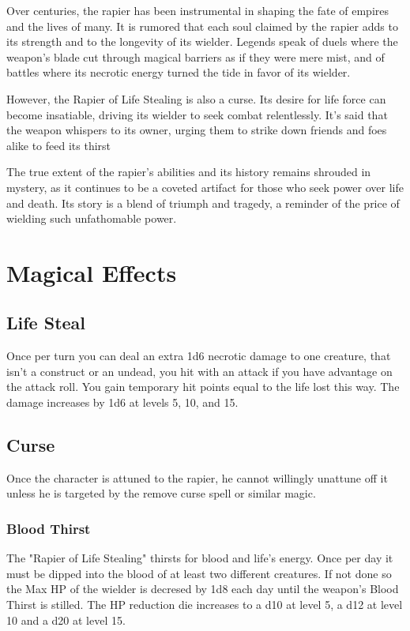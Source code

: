 Over centuries, the rapier has been instrumental in shaping the fate of empires and the lives of many. It is rumored that each soul claimed by the rapier adds to its strength and to the longevity of its wielder. Legends speak of duels where the weapon's blade cut through magical barriers as if they were mere mist, and of battles where its necrotic energy turned the tide in favor of its wielder.

However, the Rapier of Life Stealing is also a curse. Its desire for life force can become insatiable, driving its wielder to seek combat relentlessly. It's said that the weapon whispers to its owner, urging them to strike down friends and foes alike to feed its thirst

The true extent of the rapier's abilities and its history remains shrouded in mystery, as it continues to be a coveted artifact for those who seek power over life and death. Its story is a blend of triumph and tragedy, a reminder of the price of wielding such unfathomable power.

\section*{Magical Effects}
\subsection*{Life Steal}
Once per turn you can deal an extra 1d6 necrotic damage to one creature, that isn't a construct or an undead, you hit with an attack if you have advantage on the attack roll. You gain temporary hit points equal to the life lost this way. The damage increases by 1d6 at levels 5, 10, and 15.
\subsection*{Curse}
Once the character is attuned to the rapier, he cannot willingly unattune off it unless he is targeted by the remove curse spell or similar magic.
\subsubsection*{Blood Thirst}
The "Rapier of Life Stealing" thirsts for blood and life's energy. Once per day it must be dipped into the blood of at least two different creatures. If not done so the Max HP of the wielder is decresed by 1d8 each day until the weapon's Blood Thirst is stilled. The HP reduction die increases to a d10 at level 5, a d12 at level 10 and a d20 at level 15.